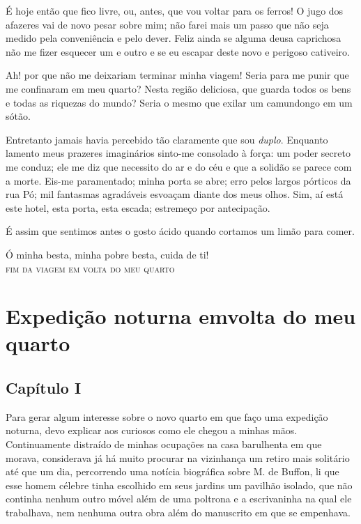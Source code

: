  É hoje então que fico livre, ou, antes, que vou voltar para os ferros!
O jugo dos afazeres vai de novo pesar sobre mim; não farei mais um
passo que não seja medido pela conveniência e pelo dever. Feliz
ainda se alguma deusa caprichosa não me fizer esquecer um e outro e se
eu escapar deste novo e perigoso cativeiro.

 Ah! por que não me deixariam terminar minha viagem! Seria para me punir
que me confinaram em meu quarto? Nesta região deliciosa, que guarda
todos os bens e todas as riquezas do mundo? Seria o mesmo que exilar um
camundongo em um sótão.  

 Entretanto jamais havia percebido tão claramente que sou
\textit{duplo}. Enquanto lamento meus prazeres imaginários sinto-me
consolado à força: um poder secreto me conduz; ele me diz que necessito
do ar e do céu e que a solidão se parece com a morte. Eis-me
paramentado; minha porta se abre; erro pelos largos pórticos da rua Pó;
mil fantasmas agradáveis esvoaçam diante dos meus olhos. Sim, aí está
este hotel, esta porta,  esta escada; estremeço por \mbox{antecipação.}
\pagebreak

É assim que sentimos antes o gosto ácido quando cortamos um limão para
comer. 

Ó minha besta, minha pobre besta, cuida de ti!
\ \\

\hfil\textsc{fim da viagem em volta do meu quarto}

\chapter[Expedição noturna em volta do meu quarto]{Expedição noturna em\break volta do meu quarto}

\section*{Capítulo I}

Para gerar algum interesse sobre o novo quarto em que faço uma expedição
noturna, devo explicar aos curiosos como ele chegou a minhas mãos.
Continuamente distraído de minhas ocupações na casa barulhenta em que
morava, considerava já há muito procurar na vizinhança um retiro mais
solitário até que um dia, percorrendo uma notícia biográfica sobre M.
de Buffon, li que esse homem célebre tinha escolhido em seus jardins um
pavilhão isolado, que não continha nenhum outro móvel além de uma
poltrona e a escrivaninha na qual ele trabalhava, nem nenhuma outra
obra além do manuscrito em que se empenhava. 

